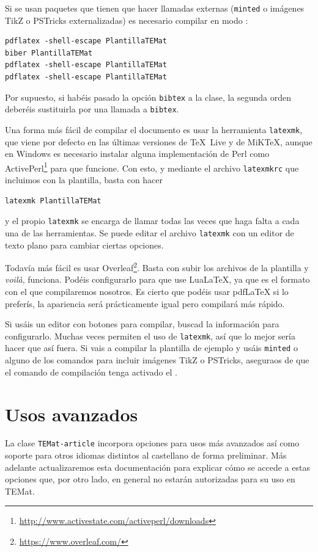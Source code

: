 \documentclass{TEMat-article}
\begin{document}
Si se usan paquetes que tienen que hacer llamadas externas (\verb+minted+ o imágenes TikZ o PSTricks externalizadas) es necesario compilar en modo :
\begin{verbatim}
pdflatex -shell-escape PlantillaTEMat
biber PlantillaTEMat
pdflatex -shell-escape PlantillaTEMat
pdflatex -shell-escape PlantillaTEMat
\end{verbatim}

Por supuesto, si habéis pasado la opción \verb+bibtex+ a la clase, la segunda orden deberéis sustituirla por una llamada a \verb+bibtex+.

Una forma más fácil de compilar el documento es usar la herramienta \verb+latexmk+, que viene por defecto en las últimas versiones de \TeX~Live y de MiK\TeX{}, aunque en Windows es necesario instalar alguna implementación de Perl como ActivePerl\footnote{\url{http://www.activestate.com/activeperl/downloads}} para que funcione.
Con esto, y mediante el archivo \verb+latexmkrc+ que incluimos con la plantilla, basta con hacer
\begin{verbatim}
latexmk PlantillaTEMat
\end{verbatim}
y el propio \verb+latexmk+ se encarga de llamar todas las veces que haga falta a cada una de las herramientas.
Se puede editar el archivo \verb+latexmk+ con un editor de texto plano para cambiar ciertas opciones.

Todavía más fácil es usar Overleaf\footnote{\url{https://www.overleaf.com/}}.
Basta con subir los archivos de la plantilla y \emph{voilà}, funciona.
Podéis configurarlo para que use LuaLaTeX, ya que es el formato con el que compilaremos nosotros.
Es cierto que podéis usar pdfLaTeX si lo preferís, la apariencia será prácticamente igual pero compilará más rápido.

Si usáis un editor con botones para compilar, buscad la información para configurarlo.
Muchas veces permiten el uso de \verb+latexmk+, así que lo mejor sería hacer que así fuera.
Si vais a compilar la plantilla de ejemplo y usáis \verb+minted+ o alguno de los comandos para incluir imágenes TikZ o PSTricks, aseguraos de que el comando de compilación tenga activado el .


\section{Usos avanzados}

La clase \verb+TEMat-article+ incorpora opciones para usos más avanzados así como soporte para otros idiomas distintos al castellano de forma preliminar.
Más adelante actualizaremos esta documentación para explicar cómo se accede a estas opciones que, por otro lado, en general no estarán autorizadas para su uso en TEMat.
\end{document}

